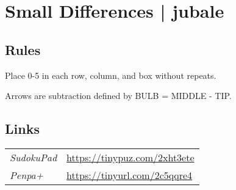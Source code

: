 \section{Small Differences | {\normalfont jubale}}
\label{sec:31-small-differences-jubale}

\subsection*{Rules}
\begin{markdown}
Place 0-5 in each row, column, and box without repeats.

Arrows are subtraction defined by BULB = MIDDLE - TIP.
\end{markdown}
\subsection*{Links}
\begin{tabularx}{\textwidth}{l X}
\emph{SudokuPad} & \url{https://tinypuz.com/2xht3ete} \\
\emph{Penpa+} & \url{https://tinyurl.com/2c5qqre4} \\
\end{tabularx}
\pagebreak
